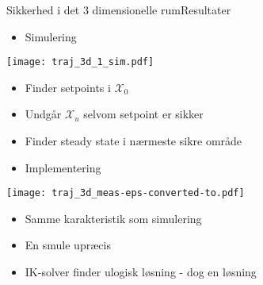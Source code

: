 \begin{frame}{Sikkerhed i det 3 dimensionelle rum}{Resultater}
\vspace*{0.4cm}
\hspace*{-0.2cm}
\begin{minipage}{0.46\textwidth}
\begin{itemize}
	\item Simulering
\end{itemize}
\texttt{[image: traj\_3d\_1\_sim.pdf]}
\begin{itemize}
	\item Finder setpoints i $\mathcal{X}_0$
	\item Undgår $\mathcal{X}_u$ selvom setpoint er sikker
	\item Finder steady state i nærmeste sikre område
\end{itemize}
\end{minipage}
\hspace{0.2cm}
\begin{minipage}{0.46\textwidth}
\begin{itemize}
	\item Implementering
\end{itemize}
\texttt{[image: traj\_3d\_meas-eps-converted-to.pdf]}
\begin{itemize}
	\item Samme karakteristik som simulering
	\item En smule upræcis
	\item IK-solver finder ulogisk løsning - dog en løsning
\end{itemize}
\end{minipage}
\end{frame}
